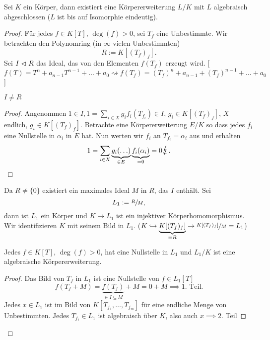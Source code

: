 \begin{theorem}
	Sei $K$ ein Körper, dann existiert eine Körpererweiterung $L / K$ mit $L$ algebraisch abgeschlossen ($L$ ist bis auf Isomorphie eindeutig).
\end{theorem}

\begin{proof}
		Für jedes $f \in K[T]$, $\deg(f) > 0$, sei $T_{f}$ eine Unbestimmte. 
		Wir betrachten den Polynomring (in $\infty$-vielen Unbestimmten)
		\[
			R := K[(T_{f})_{f}]
		.\] 
		Sei $I \vartriangleleft R$ das Ideal, das von den Elementen $f(T_{f})$ erzeugt wird.
		[$f(T) = T^{n} + a_{n-1} T^{n-1} + \ldots + a_0 \rightsquigarrow f(T_{f}) = (T_{f})^{n} + a_{n-1} + (T_{f})^{n-1} + \ldots + a_0$ ]

		\begin{claim}
			$I \neq R$
		\end{claim}
		
		\begin{proof}
			Angenommen $1 \in I, 1 = \sum_{i \in X} g_{i} f_{i}(T_{f_{i}}) \in I$, $g_{i} \in K[(T_{f})_{f}]$, $X$ endlich, $g_{i} \in K[(T_{f})_{f}]$.
			Betrachte eine Körpererweiterung $E / K$ so dass 
			jedes $f_{i}$ eine Nullstelle in $\alpha_{i}$ in $E$ hat. Nun werten wir $f_{i}$ an $T_{f_{i}} = \alpha_{i}$ aus
			und erhalten 
			\[
				1 = \sum_{i \in X} \underbrace{g_{i}(\ldots)}_{\in E} \underbrace{f_{i}(\alpha_{i})}_{=0} = 0 \contra
			.\] 
		\end{proof}
		Da $R \neq \{0\} $ existiert ein maximales Ideal $M$ in $R$, das $I$ enthält. Sei
		\[
		L_1 := \sfrac{R}{M}
		,\] 
		dann ist $L_1$ ein Körper und $K \to L_1$ ist ein injektiver Körperhomomorphismus.
		Wir identifizieren $K$ mit seinem Bild in $L_1$. ($K \hookrightarrow \underbrace{K[(T_{f})_{f}]}_{=R} \to \sfrac{K[(T_{f})_{f}]}{M} = L_1$)

		\begin{claim}
			Jedes $f \in K[T]$, $\deg(f) > 0$, hat eine Nullstelle in $L_1$ und $L_1 / K$ ist eine algebraische Körpererweiterung.
		\end{claim}

		\begin{proof}
			Das Bild von $T_{f}$ in $L_1$ ist eine Nullstelle von $f \in L_1[T]$ 
			\[
				f(T_{f} + M) = \underbrace{f(T_{f})}_{\in I \subseteq M} + M = 0 + M \implies 1. \text{ Teil}
			.\] 
			Jedes $x \in L_1$ ist im Bild von $K[T_{f_1},\ldots,T_{f_{m}}]$ für eine endliche Menge von Unbestimmten.
			Jedes $T_{f_i} \in L_1$ ist algebraisch über $K$, also auch $x \implies 2.$  Teil
		\end{proof}


\end{proof}
